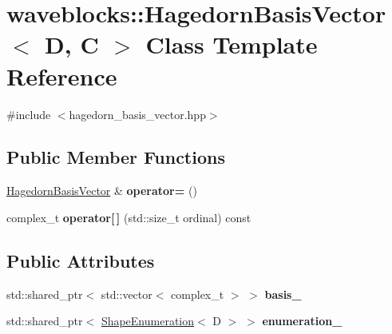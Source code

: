 \hypertarget{classwaveblocks_1_1_hagedorn_basis_vector}{}\section{waveblocks\+:\+:Hagedorn\+Basis\+Vector$<$ D, C $>$ Class Template Reference}
\label{classwaveblocks_1_1_hagedorn_basis_vector}


{\ttfamily \#include $<$hagedorn\+\_\+basis\+\_\+vector.\+hpp$>$}

\subsection*{Public Member Functions}
\begin{DoxyCompactItemize}
\item 
\hypertarget{classwaveblocks_1_1_hagedorn_basis_vector_a1695e11a7ba9e702a0a08c8654adc531}{}\hyperlink{classwaveblocks_1_1_hagedorn_basis_vector}{Hagedorn\+Basis\+Vector} \& {\bfseries operator=} ()\label{classwaveblocks_1_1_hagedorn_basis_vector_a1695e11a7ba9e702a0a08c8654adc531}

\item 
\hypertarget{classwaveblocks_1_1_hagedorn_basis_vector_a8693a19efb02de313a07ec1062be4401}{}complex\+\_\+t {\bfseries operator\mbox{[}$\,$\mbox{]}} (std\+::size\+\_\+t ordinal) const \label{classwaveblocks_1_1_hagedorn_basis_vector_a8693a19efb02de313a07ec1062be4401}

\end{DoxyCompactItemize}
\subsection*{Public Attributes}
\begin{DoxyCompactItemize}
\item 
\hypertarget{classwaveblocks_1_1_hagedorn_basis_vector_a974eac628768ffaed92ad4d59e0c3414}{}std\+::shared\+\_\+ptr$<$ std\+::vector$<$ complex\+\_\+t $>$ $>$ {\bfseries basis\+\_\+}\label{classwaveblocks_1_1_hagedorn_basis_vector_a974eac628768ffaed92ad4d59e0c3414}

\item 
\hypertarget{classwaveblocks_1_1_hagedorn_basis_vector_a97c749161b09e86d6813d8be86271f53}{}std\+::shared\+\_\+ptr$<$ \hyperlink{classwaveblocks_1_1_shape_enumeration}{Shape\+Enumeration}$<$ D $>$ $>$ {\bfseries enumeration\+\_\+}\label{classwaveblocks_1_1_hagedorn_basis_vector_a97c749161b09e86d6813d8be86271f53}

\end{DoxyCompactItemize}


